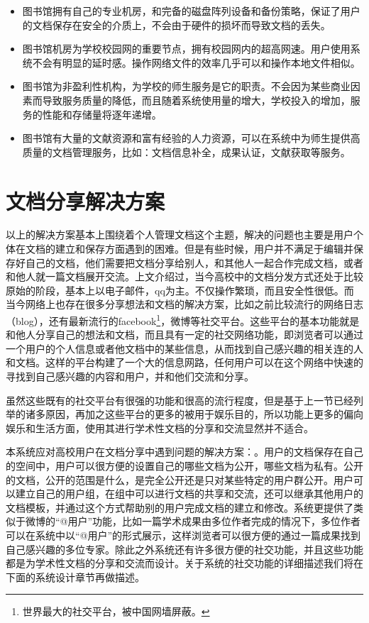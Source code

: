 \begin{itemize}
\item 图书馆拥有自己的专业机房，和完备的磁盘阵列设备和备份策略，保证了用户的文档保存在安全的介质上，不会由于硬件的损坏而导致文档的丢失。%
\item 图书馆机房为学校校园网的重要节点，拥有校园网内的超高网速。用户使用系统不会有明显的延时感。操作网络文件的效率几乎可以和操作本地文件相似。
\item 图书馆为非盈利性机构，为学校的师生服务是它的职责。不会因为某些商业因素而导致服务质量的降低，而且随着系统使用量的增大，学校投入的增加，服务的性能和存储量将逐年递增。
\item 图书馆有大量的文献资源和富有经验的人力资源，可以在系统中为师生提供高质量的文档管理服务，比如：文档信息补全，成果认证，文献获取等服务。
\end{itemize}

\section{文档分享解决方案}
\label{sec:giveout}

以上的解决方案基本上围绕着个人管理文档这个主题，解决的问题也主要是用户个体在文档的建立和保存方面遇到的困难。但是有些时候，用户并不满足于编辑并保存好自己的文档，他们需要把文档分享给别人，和其他人一起合作完成文档，或者和他人就一篇文档展开交流。上文介绍过，当今高校中的文档分发方式还处于比较原始的阶段，基本上以电子邮件，qq为主。不仅操作繁琐，而且安全性很低。而当今网络上也存在很多分享想法和文档的解决方案，比如之前比较流行的网络日志（blog），还有最新流行的facebook\footnote{世界最大的社交平台，被中国网墙屏蔽。}，微博等社交平台。这些平台的基本功能就是和他人分享自己的想法和文档，而且具有一定的社交网络功能，即浏览者可以通过一个用户的个人信息或者他文档中的某些信息，从而找到自己感兴趣的相关连的人和文档。这样的平台构建了一个大的信息网路，任何用户可以在这个网络中快速的寻找到自己感兴趣的内容和用户，并和他们交流和分享。

虽然这些既有的社交平台有很强的功能和很高的流行程度，但是基于上一节已经列举的诸多原因，再加之这些平台的更多的被用于娱乐目的，所以功能上更多的偏向娱乐和生活方面，使用其进行学术性文档的分享和交流显然并不适合。

本系统应对高校用户在文档分享中遇到问题的解决方案：。用户的文档保存在自己的空间中，用户可以很方便的设置自己的哪些文档为公开，哪些文档为私有。公开的文档，公开的范围是什么，是完全公开还是只对某些特定的用户群公开。用户可以建立自己的用户组，在组中可以进行文档的共享和交流，还可以继承其他用户的文档模板，并通过这个方式帮助别的用户完成文档的建立和修改。系统更提供了类似于微博的“@用户”功能，比如一篇学术成果由多位作者完成的情况下，多位作者可以在系统中以“@用户”的形式展示，这样浏览者可以很方便的通过一篇成果找到自己感兴趣的多位专家。除此之外系统还有许多很方便的社交功能，并且这些功能都是为学术性文档的分享和交流而设计。关于系统的社交功能的详细描述我们将在下面的系统设计章节再做描述。
